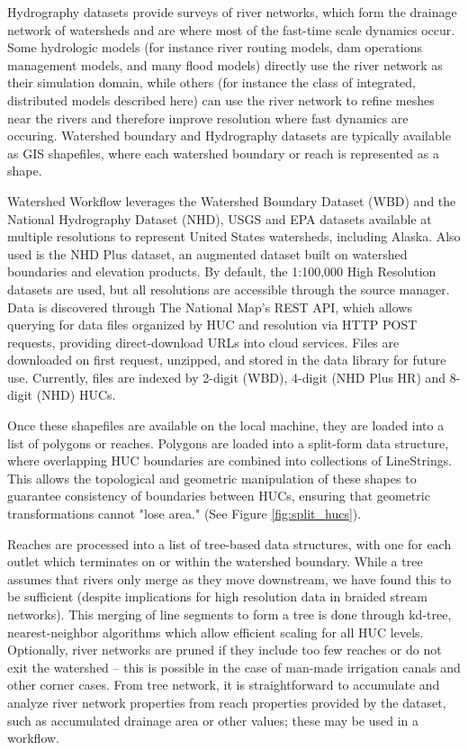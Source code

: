 \documentclass[a4paper,fleqn]{cas-dc}
\begin{document}
Hydrography datasets provide surveys of river networks, which form the drainage network of watersheds and are where most of the fast-time scale dynamics occur.
Some hydrologic models (for instance river routing models, dam operations management models, and many flood models) directly use the river network as their simulation domain, while others (for instance the class of integrated, distributed models described here) can use the river network to refine meshes near the rivers and therefore improve resolution where fast dynamics are occuring.
Watershed boundary and Hydrography datasets are typically available as GIS shapefiles, where each watershed boundary or reach is represented as a shape.

Watershed Workflow leverages the Watershed Boundary Dataset (WBD) and the National Hydrography Dataset (NHD), USGS and EPA datasets available at multiple resolutions to represent United States watersheds, including Alaska.\cite{NHD}
Also used is the NHD Plus dataset, an augmented dataset built on watershed boundaries and elevation products.
By default, the 1:100,000 High Resolution datasets are used, but all resolutions are accessible through the source manager.
Data is discovered through The National Map's REST API, which allows querying for data files organized by HUC and resolution via HTTP POST requests, providing direct-download URLs into cloud services.
Files are downloaded on first request, unzipped, and stored in the data library for future use.
Currently, files are indexed by 2-digit (WBD), 4-digit (NHD Plus HR) and 8-digit (NHD) HUCs.


Once these shapefiles are available on the local machine, they are loaded into a list of polygons or reaches.
Polygons are loaded into a split-form data structure, where overlapping HUC boundaries are combined into collections of LineStrings.
This allows the topological and geometric manipulation of these shapes to guarantee consistency of boundaries between HUCs, ensuring that geometric transformations cannot "lose area."  (See Figure \ref{fig:split_hucs}).

Reaches are processed into a list of tree-based data structures, with one for each outlet which terminates on or within the watershed boundary.
While a tree assumes that rivers only merge as they move downstream, we have found this to be sufficient (despite implications for high resolution data in braided stream networks).
This merging of line segments to form a tree is done through kd-tree, nearest-neighbor algorithms which allow efficient scaling for all HUC levels.
Optionally, river networks are pruned if they include too few reaches or do not exit the watershed -- this is possible in the case of man-made irrigation canals and other corner cases.
From tree network, it is straightforward to accumulate and analyze river network properties from reach properties provided by the dataset, such as accumulated drainage area or other values; these may be used in a workflow.
\end{document}
